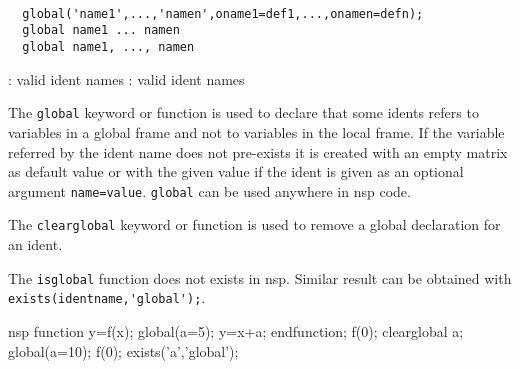 \begin{mandesc}
   \\ %
   \\ %
   \\ %
\end{mandesc}
\begin{calling_sequence}
\begin{verbatim}
  global('name1',...,'namen',oname1=def1,...,onamen=defn);
  global name1 ... namen
  global name1, ..., namen
\end{verbatim}
\end{calling_sequence}
\begin{parameters}
  \begin{varlist}
    : valid ident names
    : valid ident names
  \end{varlist}
\end{parameters}
\begin{mandescription}
  The \verb!global! keyword or function is used to declare that some idents 
  refers to variables in a global frame and not to variables in the local frame.
  If the variable referred by the ident name does not pre-exists 
  it is created with an empty matrix as default value or with the given value 
  if the ident is given as an optional argument \verb!name=value!. 
  \verb!global! can be used anywhere in nsp code.
  
  The \verb!clearglobal! keyword or function is used to remove a global 
  declaration for an ident.
  
  The \verb!isglobal! function does not exists in nsp. Similar result 
  can be obtained with \verb!exists(identname,'global');!.
\end{mandescription}
\begin{examples}
  \begin{mintednsp}{nsp}
    function y=f(x); global(a=5); y=x+a; endfunction;
    f(0);
    clearglobal a;
    global(a=10);
    f(0);
    exists('a','global');
  \end{mintednsp}
\end{examples}
\begin{manseealso}
     
\end{manseealso}
